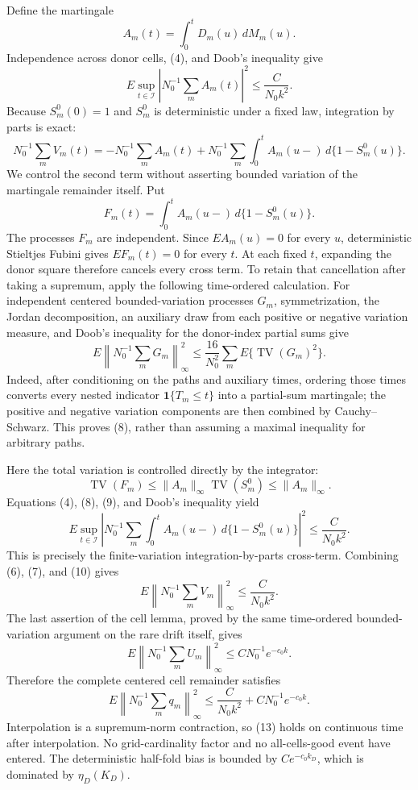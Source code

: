 Define the martingale
\[
 A_m(t)=\int_0^tD_m(u)\,dM_m(u).
\]
Independence across donor cells, (4), and Doob's inequality give
\[
 E\sup_{t\in\mathcal I}
 \left|N_0^{-1}\sum_mA_m(t)\right|^2
 \leq \frac{C}{N_0k^2}.                                 \tag{6}
\]
Because \(S_m^0(0)=1\) and \(S_m^0\) is deterministic under a fixed law,
integration by parts is exact:
\[
 N_0^{-1}\sum_mV_m(t)
 =-N_0^{-1}\sum_mA_m(t)
  +N_0^{-1}\sum_m\int_0^tA_m(u-)\,d\{1-S_m^0(u)\}.     \tag{7}
\]
We control the second term without asserting bounded variation of the
martingale remainder itself.  Put
\[
 F_m(t)=\int_0^tA_m(u-)\,d\{1-S_m^0(u)\}.
\]
The processes \(F_m\) are independent.  Since \(EA_m(u)=0\) for every
\(u\), deterministic Stieltjes Fubini gives \(EF_m(t)=0\) for every \(t\).
At each fixed \(t\), expanding the donor square therefore cancels every
cross term.  To retain that cancellation after taking a supremum, apply the
following time-ordered calculation.  For independent centered
bounded-variation processes \(G_m\), symmetrization, the Jordan decomposition,
an auxiliary draw from each positive or negative variation measure, and
Doob's inequality for the donor-index partial sums give
\[
 E\left\|N_0^{-1}\sum_mG_m\right\|_\infty^2
 \leq\frac{16}{N_0^2}\sum_mE\{\operatorname{TV}(G_m)^2\}. \tag{8}
\]
Indeed, after conditioning on the paths and auxiliary times, ordering those
times converts every nested indicator \(\mathbf 1\{T_m\leq t\}\) into a
partial-sum martingale; the positive and negative variation components are
then combined by Cauchy--Schwarz.  This proves (8), rather than assuming a
maximal inequality for arbitrary paths.

Here the total variation is controlled directly by the integrator:
\[
 \operatorname{TV}(F_m)
 \leq \|A_m\|_\infty\operatorname{TV}(S_m^0)
 \leq\|A_m\|_\infty.                                    \tag{9}
\]
Equations (4), (8), (9), and Doob's inequality yield
\[
 E\sup_{t\in\mathcal I}
 \left|N_0^{-1}\sum_m
 \int_0^tA_m(u-)\,d\{1-S_m^0(u)\}\right|^2
 \leq\frac{C}{N_0k^2}.                                  \tag{10}
\]
This is precisely the finite-variation integration-by-parts cross-term.
Combining (6), (7), and (10) gives
\[
 E\left\|N_0^{-1}\sum_mV_m\right\|_\infty^2
 \leq\frac{C}{N_0k^2}.                                  \tag{11}
\]
The last assertion of the cell lemma, proved by the same time-ordered
bounded-variation argument on the rare drift itself, gives
\[
 E\left\|N_0^{-1}\sum_mU_m\right\|_\infty^2
 \leq CN_0^{-1}e^{-c_0k}.                               \tag{12}
\]
Therefore the complete centered cell remainder satisfies
\[
 E\left\|N_0^{-1}\sum_mq_m\right\|_\infty^2
 \leq\frac{C}{N_0k^2}+CN_0^{-1}e^{-c_0k}.               \tag{13}
\]
Interpolation is a supremum-norm contraction, so (13) holds on continuous
time after interpolation.  No grid-cardinality factor and no all-cells-good
event have entered.  The deterministic half-fold bias is bounded by
\(Ce^{-c_0k_D}\), which is dominated by \(\eta_D(K_D)\).

